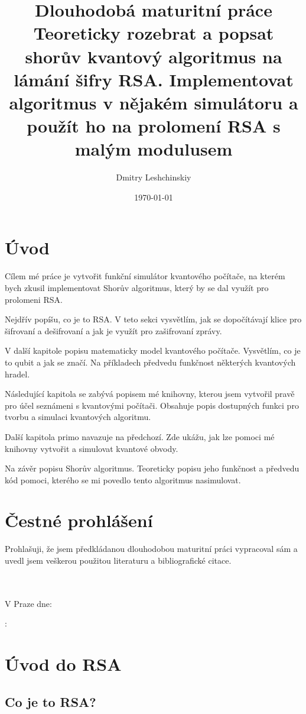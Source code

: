 \documentclass[11pt]{article}
\title{Dlouhodobá maturitní práce \\
\large Teoreticky rozebrat a popsat shorův kvantový algoritmus na lámání šifry RSA. 
Implementovat algoritmus v nějakém simulátoru a použít ho na prolomení RSA s malým modulusem}
\author{Dmitry Leshchinskiy}
\date{\today}
\makeatletter
\let\myauthor\@author
\let\mydate\@date
\makeatother
\begin{document}
\maketitle
\newpage

\tableofcontents
\newpage

\section{Úvod}
Cílem mé práce je vytvořit funkční simulátor kvantového počítače, na kterém bych zkusil implementovat Shorův algoritmus, který by se dal využít pro prolomeni RSA.
\par Nejdřív popíšu, co je to RSA.
V teto sekci vysvětlím, jak se dopočítávají klice pro šifrovaní a dešifrovaní a jak je využít pro zašifrovaní zprávy.
\par V další kapitole popisu matematicky model kvantového počítače.
Vysvětlím, co je to qubit a jak se značí.
Na příkladech předvedu funkčnost některých kvantových hradel.
\par Následující kapitola se zabývá popisem mé knihovny, kterou jsem vytvořil pravě pro účel seznámeni s kvantovými počítači.
Obsahuje popis dostupných funkci pro tvorbu a simulaci kvantových algoritmu.
\par Další kapitola primo navazuje na předchozí.
Zde ukážu, jak lze pomoci mé knihovny vytvořit a simulovat kvantové obvody.
\par Na závěr popisu Shorův algoritmus.
Teoreticky popisu jeho funkčnost a předvedu kód pomoci, kterého se mi povedlo tento algoritmus nasimulovat.
\newpage

\section{Čestné prohlášení}
Prohlašuji, že jsem předkládanou dlouhodobou maturitní práci vypracoval
sám a uvedl jsem veškerou použitou literaturu a bibliografické citace.
\\ \\ \\
\par V Praze dne: \mydate \\
\par \myauthor: \hrulefill
\newpage

\section{Úvod do RSA}
\subsection{Co je to RSA?}
\end{document}
